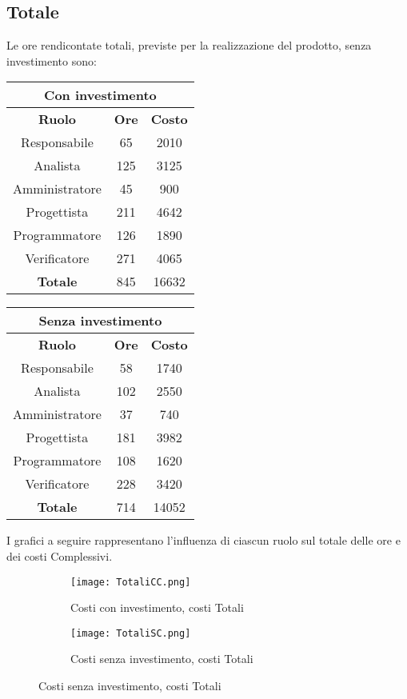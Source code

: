 \documentclass{scalatekids-article}
\begin{document}
\subsection{Totale}
Le ore rendicontate totali, previste per la realizzazione del prodotto, senza
investimento sono:
\begin{center}
  \normalsize
  \begin{tabular}{| c | c | c |}
    \hline
    \multicolumn{3}{|c|}{\textbf{Con investimento}}\\
    \hline
    \textbf{Ruolo} & \textbf{Ore} & \textbf{Costo}\\
    \hline
    Responsabile & 65 & 2010 \\
    Analista & 125 & 3125\\
    Amministratore & 45 & 900\\
    Progettista & 211 & 4642\\
    Programmatore & 126 & 1890\\
    Verificatore & 271 & 4065\\
    \hline
    \textbf{Totale} & 845 & 16632\\
    \hline
  \end{tabular}
  \qquad
  \begin{tabular}{| c | c | c |}
    \hline
    \multicolumn{3}{|c|}{\textbf{Senza investimento}}\\
    \hline
    \textbf{Ruolo} & \textbf{Ore} & \textbf{Costo}\\
    \hline
    Responsabile & 58 & 1740\\
    Analista & 102 & 2550\\
    Amministratore & 37 & 740\\
    Progettista & 181 & 3982\\
    Programmatore & 108 & 1620\\
    Verificatore & 228 & 3420\\
    \hline
    \textbf{Totale} & 714 & 14052 \\
    \hline
  \end{tabular}
\end{center}
I grafici a seguire rappresentano l'influenza di ciascun ruolo sul totale delle ore e dei costi Complessivi.
\begin{figure}[H]
  \begin{subfigure}[H]{0.47\textwidth}
    \texttt{[image: TotaliCC.png]}
    \caption{Costi con investimento, costi Totali}
  \end{subfigure}
  \qquad
  \begin{subfigure}[H]{0.47\textwidth}
    \texttt{[image: TotaliSC.png]}
    \caption{Costi senza investimento, costi Totali}
  \end{subfigure}
\end{figure}
\end{document}
